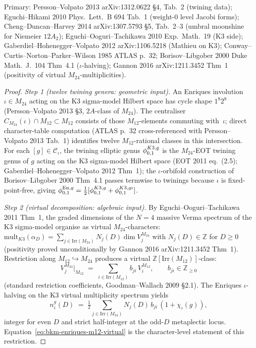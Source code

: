 \begin{theorem}
Primary:
Persson--Volpato 2013 arXiv:1312.0622 \S 4, Tab.~2 (twining data);
Eguchi--Hikami 2010 Phys.\ Lett.\ B 694 Tab.~1 (weight-0 level Jacobi forms);
Cheng--Duncan--Harvey 2014 arXiv:1307.5793 \S 5, Tab.~2--3 (umbral moonshine
for Niemeier $12A_2$);
Eguchi--Ooguri--Tachikawa 2010 Exp.\ Math.\ 19 (K3 side);
Gaberdiel--Hohenegger--Volpato 2012 arXiv:1106.5218 (Mathieu on K3);
Conway--Curtis--Norton--Parker--Wilson 1985 ATLAS p.~32;
Borisov--Libgober 2000 Duke Math.\ J.\ 104 Thm~4.1 ($\iota$-halving);
Gannon 2016 arXiv:1211.3452 Thm~1 (positivity of virtual $M_{24}$-multiplicities).
\end{theorem}

\begin{proof}[Proof]
\emph{Step 1 (twelve twining genera: geometric input).}
An Enriques involution $\iota\in M_{24}$ acting on the K3 sigma-model
Hilbert space has cycle shape $1^8 2^8$ (Persson--Volpato 2013 \S 3,
$2A$-class of $M_{24}$). The centraliser
$C_{M_{24}}(\iota)\cap M_{12}\subset M_{12}$ consists of those
$M_{12}$-elements commuting with~$\iota$; direct character-table
computation (ATLAS p.~32 cross-referenced with Persson--Volpato 2013
Tab.~1) identifies twelve $M_{12}$-rational classes in this intersection.
For each $[g]\in\mathcal{C}_\iota$, the twining elliptic genus
$\phi^{K3,g}_{0,1}$ is the $M_{24}$-EOT twining genus of $g$ acting on the K3
sigma-model Hilbert space (EOT 2011 eq.~(2.5);
Gaberdiel--Hohenegger--Volpato 2012 Thm~1); the $\iota$-orbifold
construction of Borisov--Libgober 2000 Thm~4.1 passes termwise to
twinings because $\iota$ is fixed-point-free, giving
$\phi^{\mathrm{En},g}_{0,1} = \tfrac{1}{2}[\phi^{K3,g}_{0,1} + \phi^{K3,g\iota}_{0,1}]$.

\emph{Step 2 (virtual decomposition: algebraic input).}
By Eguchi--Ooguri--Tachikawa 2011 Thm~1, the graded dimensions of the
$N=4$ massive Verma spectrum of the K3 sigma-model organise as
virtual $M_{24}$-characters:
$\mathrm{mult}_{K3}(\alpha_D) = \sum_{j\in\mathrm{Irr}(M_{24})}N_j(D)\dim V_j^{M_{24}}$
with $N_j(D)\in\mathbb{Z}$ for $D\geq 0$ (positivity proved
unconditionally by Gannon 2016 arXiv:1211.3452 Thm~1). Restriction along
$M_{12}\hookrightarrow M_{24}$ produces a virtual
$\mathbb{Z}[\mathrm{Irr}(M_{12})]$-class:
\[
 V_j^{M_{24}}\bigr|_{M_{12}}
 \;=\;
 \sum_{i\in\mathrm{Irr}(M_{12})} b_{ji}\,V_i^{M_{12}},
 \qquad b_{ji}\in\mathbb{Z}_{\geq 0}
\]
(standard restriction coefficients, Goodman--Wallach 2009 \S 2.1). The
Enriques $\iota$-halving on the K3 virtual multiplicity spectrum yields
\[
 n^g_i(D)
 \;=\;
 \tfrac{1}{2}\sum_{j\in\mathrm{Irr}(M_{24})}N_j(D)\, b_{ji}\,
 (1 + \chi_\iota(g)),
\]
integer for even $D$ and strict half-integer at the odd-$D$ metaplectic
locus. Equation~\eqref{eq:bkm-enriques-m12-virtual} is the
character-level statement of this restriction.


\end{proof}
